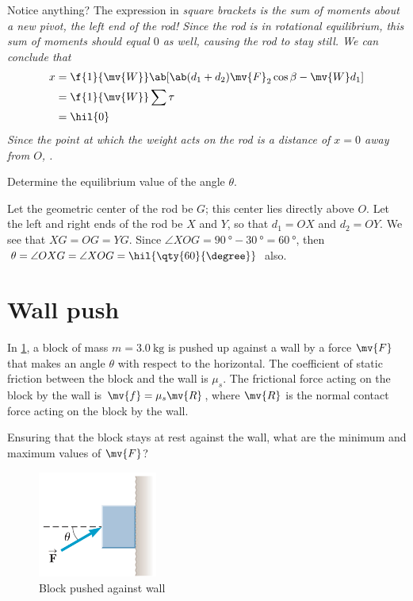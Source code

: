 Notice anything? The expression in \it{square brackets} is the sum of moments
about a new pivot, the left end of the rod! Since the rod is in
rotational equilibrium,
this sum of moments should equal \(0\) as well, causing the rod to stay still.
We can conclude that
\begin{align*}
  x &= \f{1}{\mv{W}} \ab[\ab(d_1+d_2)\mv{F}_2\cos\beta - \mv{W}d_1] \\
  &= \f{1}{\mv{W}} \sum\tau \\
  &= \hil{0}
\end{align*}
Since the point at which the weight acts on the rod is a distance of \(x = 0\)
away from \(O\), .

\begin{problem}
  Determine the equilibrium value of the angle \(\theta\).
\end{problem}
Let the geometric center of the rod be \(G\); this center lies
directly above \(O\).  Let the left and right ends of the rod be
\(X\) and \(Y\), so that \(d_1 = OX\) and \(d_2 = OY\).  We see that
\(XG = OG = YG\). Since \(\angle XOG =
\qty{90}{\degree}-\qty{30}{\degree}=\qty{60}{\degree}\), then
\(\theta=\angle OXG = \angle XOG = \hil{ \qty{60}{\degree} }\) also.

\section{Wall push}
\begin{problem}
  In \cref{fig:wallpush}, a block of mass \(m = \qty{3.0}{\kg}\) is
  pushed up against a wall by a force
  \(\mv{F}\) that makes an angle \(\theta\) with respect to the horizontal.
  The coefficient of static friction between the block and the wall
  is \(\mu_s\).
  The frictional force acting on the block by the wall is \(\mv{f} =
  \mu_s\mv{R}\),
  where \(\mv{R}\) is the normal contact force acting on the block by the wall.

  Ensuring that the block stays at rest against the wall, what are the minimum
  and maximum values of \(\mv{F}\)?
\end{problem}
\begin{figure}
  \centering
  \includegraphics[width=0.35\textwidth]{assets/wallpush.png}
  \caption{Block pushed against wall}
  \label{fig:wallpush}
\end{figure}
